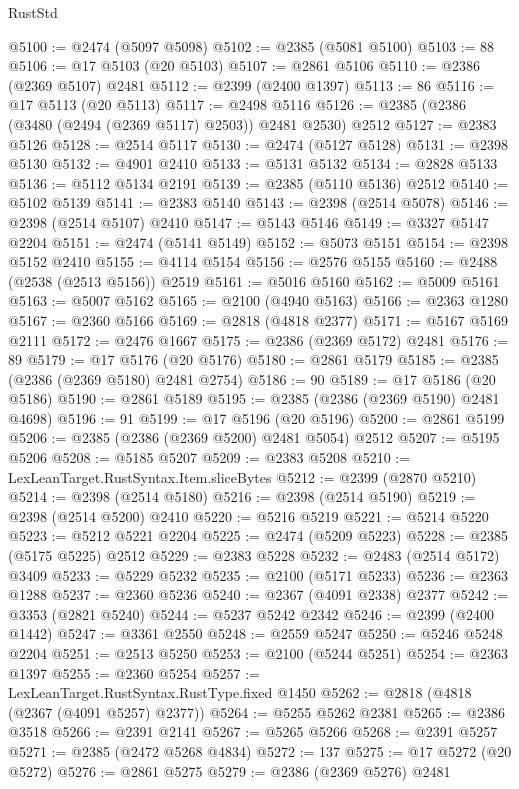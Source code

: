 \begin{lexlean}{RustStd}
\begin{coremodule}
@5100 := @2474 (@5097 @5098)
@5102 := @2385 (@5081 @5100)
@5103 := 88
@5106 := @17 @5103 (@20 @5103)
@5107 := @2861 @5106
@5110 := @2386 (@2369 @5107) @2481
@5112 := @2399 (@2400 @1397)
@5113 := 86
@5116 := @17 @5113 (@20 @5113)
@5117 := @2498 @5116
@5126 := @2385 (@2386 (@3480 (@2494 (@2369 @5117) @2503)) @2481 @2530) @2512
@5127 := @2383 @5126
@5128 := @2514 @5117
@5130 := @2474 (@5127 @5128)
@5131 := @2398 @5130
@5132 := @4901 @2410
@5133 := @5131 @5132
@5134 := @2828 @5133
@5136 := @5112 @5134 @2191
@5139 := @2385 (@5110 @5136) @2512
@5140 := @5102 @5139
@5141 := @2383 @5140
@5143 := @2398 (@2514 @5078)
@5146 := @2398 (@2514 @5107) @2410
@5147 := @5143 @5146
@5149 := @3327 @5147 @2204
@5151 := @2474 (@5141 @5149)
@5152 := @5073 @5151
@5154 := @2398 @5152 @2410
@5155 := @4114 @5154
@5156 := @2576 @5155
@5160 := @2488 (@2538 (@2513 @5156)) @2519
@5161 := @5016 @5160
@5162 := @5009 @5161
@5163 := @5007 @5162
@5165 := @2100 (@4940 @5163)
@5166 := @2363 @1280
@5167 := @2360 @5166
@5169 := @2818 (@4818 @2377)
@5171 := @5167 @5169 @2111
@5172 := @2476 @1667
@5175 := @2386 (@2369 @5172) @2481
@5176 := 89
@5179 := @17 @5176 (@20 @5176)
@5180 := @2861 @5179
@5185 := @2385 (@2386 (@2369 @5180) @2481 @2754)
@5186 := 90
@5189 := @17 @5186 (@20 @5186)
@5190 := @2861 @5189
@5195 := @2385 (@2386 (@2369 @5190) @2481 @4698)
@5196 := 91
@5199 := @17 @5196 (@20 @5196)
@5200 := @2861 @5199
@5206 := @2385 (@2386 (@2369 @5200) @2481 @5054) @2512
@5207 := @5195 @5206
@5208 := @5185 @5207
@5209 := @2383 @5208
@5210 := LexLeanTarget.RustSyntax.Item.sliceBytes
@5212 := @2399 (@2870 @5210)
@5214 := @2398 (@2514 @5180)
@5216 := @2398 (@2514 @5190)
@5219 := @2398 (@2514 @5200) @2410
@5220 := @5216 @5219
@5221 := @5214 @5220
@5223 := @5212 @5221 @2204
@5225 := @2474 (@5209 @5223)
@5228 := @2385 (@5175 @5225) @2512
@5229 := @2383 @5228
@5232 := @2483 (@2514 @5172) @3409
@5233 := @5229 @5232
@5235 := @2100 (@5171 @5233)
@5236 := @2363 @1288
@5237 := @2360 @5236
@5240 := @2367 (@4091 @2338) @2377
@5242 := @3353 (@2821 @5240)
@5244 := @5237 @5242 @2342
@5246 := @2399 (@2400 @1442)
@5247 := @3361 @2550
@5248 := @2559 @5247
@5250 := @5246 @5248 @2204
@5251 := @2513 @5250
@5253 := @2100 (@5244 @5251)
@5254 := @2363 @1397
@5255 := @2360 @5254
@5257 := LexLeanTarget.RustSyntax.RustType.fixed @1450
@5262 := @2818 (@4818 (@2367 (@4091 @5257) @2377))
@5264 := @5255 @5262 @2381
@5265 := @2386 @3518
@5266 := @2391 @2141
@5267 := @5265 @5266
@5268 := @2391 @5257
@5271 := @2385 (@2472 @5268 @4834)
@5272 := 137
@5275 := @17 @5272 (@20 @5272)
@5276 := @2861 @5275
@5279 := @2386 (@2369 @5276) @2481

\end{coremodule}
\end{lexlean}
